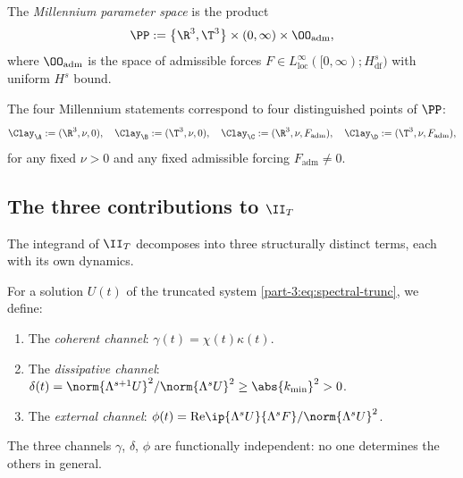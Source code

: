\begin{definition}\label{part-3:def:parameter}
The \emph{Millennium parameter space} is the product
\begin{equation}\label{part-3:eq:parameter-space}
\PP := \bigl\{\R^3, \T^3\bigr\} \times (0,\infty) \times 
\OO_{\mathrm{adm}},
\end{equation}
where $\OO_{\mathrm{adm}}$ is the space of admissible forces 
$F\in L^\infty_{\mathrm{loc}}([0,\infty);H^s_{\mathrm{df}})$ with 
uniform $H^s$ bound.
\end{definition}

The four Millennium statements correspond to four distinguished 
points of $\PP$:
\begin{equation}\label{part-3:eq:four-points}
\Clay_{\A} := (\R^3, \nu, 0),\quad
\Clay_{\B} := (\T^3, \nu, 0),\quad
\Clay_{\C} := (\R^3, \nu, F_{\mathrm{adm}}),\quad
\Clay_{\D} := (\T^3, \nu, F_{\mathrm{adm}}),
\end{equation}
for any fixed $\nu>0$ and any fixed admissible forcing 
$F_{\mathrm{adm}}\neq 0$.

\subsection{The three contributions to $\II_T$}
\label{part-3:ssec:three-terms}

The integrand of $\II_T$ decomposes into three structurally distinct 
terms, each with its own dynamics.

\begin{definition}\label{part-3:def:three-channels}
For a solution $U(t)$ of the truncated system 
\eqref{part-3:eq:spectral-trunc}, we define:
\begin{enumerate}[label=(\roman*),leftmargin=*]
\item The \emph{coherent channel}:
      $\gamma(t) = \chi(t)\kappa(t)$.
\item The \emph{dissipative channel}:
      $\delta(t) = \norm{\Lambda^{s+1}U}^2/\norm{\Lambda^s U}^2 \geq 
      \abs{k_{\min}}^2 > 0$.
\item The \emph{external channel}:
      $\phi(t) = \mathrm{Re}\ip{\Lambda^s U}{\Lambda^s F}/
      \norm{\Lambda^s U}^2$.
\end{enumerate}
\end{definition}

\begin{proposition}\label{part-3:prop:independent}
The three channels $\gamma$, $\delta$, $\phi$ are functionally 
independent: no one determines the others in general.
\end{proposition}

